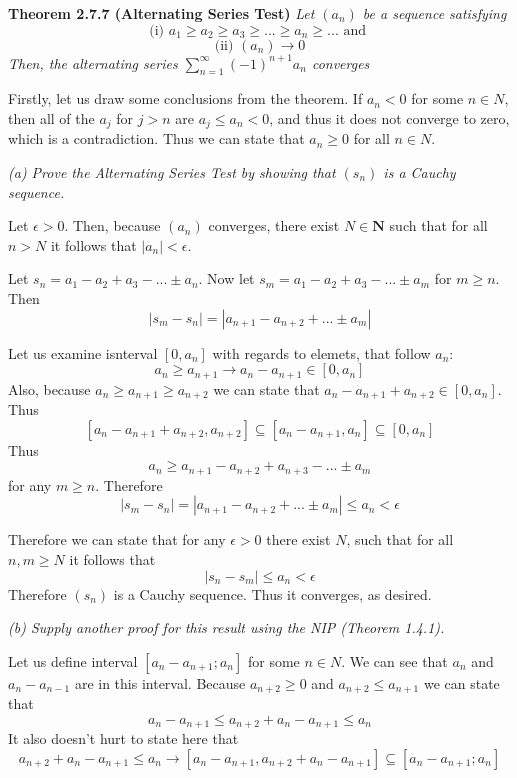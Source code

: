 \documentclass[11pt,oneside,titlepage]{article}
\begin{document}
\textbf{Theorem 2.7.7 (Alternating Series Test)}
\textit{Let $(a_n)$ be a sequence satisfying}
$$\text{(i) } a_1 \geq a_2 \geq a_3 \geq ... \geq a_n \geq ... \text{ and }$$
$$\text{(ii) } (a_n) \to 0$$
\textit{Then, the alternating series $\sum_{n = 1}^{\infty}(-1)^{n + 1} a_n$
converges}

Firstly, let us draw some conclusions from the theorem. If $a_n < 0$ for
some $n \in N$, then all of the $a_j$ for $j > n$ are $a_j \leq a_n < 0$, and
thus it does not converge to zero, which is a contradiction. Thus we
can state that $a_n \geq 0$ for all $n \in N$.

\textit{(a) Prove the Alternating Series Test by showing that $(s_n)$ is a
  Cauchy sequence.}


Let $\epsilon > 0$. Then, because $(a_n)$ converges, there exist
$N \in \textbf{N}$ such that for all $n > N$ it follows that
$|a_n| < \epsilon$.

Let $s_n = a_1 - a_2 + a_3 - ... \pm a_n$. Now let
$s_m = a_1 - a_2 + a_3 - ... \pm a_m$ for $m \geq n$. Then
$$|s_m - s_n| = |a_{n + 1} - a_{n + 2} + ... \pm a_m|$$

Let us examine isnterval $[0, a_n]$ with regards to elemets, that follow $a_n$:
$$a_n \geq a_{n + 1} \to a_n - a_{n + 1} \in [0, a_n]$$
Also, because $a_n \geq a_{n + 1} \geq a_{n + 2}$ we can state that
$a_n - a_{n + 1} + a_{n + 2} \in [0, a_n]$.  Thus
$$[a_n - a_{n + 1} + a_{n + 2}, a_{n + 2}] \subseteq
[a_n - a_{n + 1}, a_n] \subseteq [0, a_n]$$
Thus
$$ a_n \geq a_{n + 1} - a_{n + 2} + a_{n + 3} - ... \pm a_m$$
for any $m \geq n$.
Therefore
$$|s_m - s_n| = |a_{n + 1} - a_{n + 2} + ... \pm a_m| \leq a_n < \epsilon$$


Therefore we can state that for any $\epsilon > 0$ there exist $N$, such that for all
$n, m \geq N$ it follows that
$$|s_n - s_m| \leq a_n < \epsilon$$
Therefore $(s_n)$ is a Cauchy sequence. Thus it converges, as desired.

\textit{(b) Supply another proof for this result using the NIP (Theorem 1.4.1).
}

Let us define  interval $[a_n - a_{n + 1}; a_n]$ for some $n \in N$.
We can see that
$a_n$ and $a_n - a_{n - 1}$ are in this interval. Because
$a_{n + 2} \geq 0$ and  $a_{n + 2} \leq a_{n + 1}$ we can state that
$$a_n - a_{n + 1} \leq a_{n + 2} + a_n - a_{n + 1} \leq a_n$$
It also doesn't hurt to state here that
$$a_{n + 2} + a_n - a_{n + 1} \leq a_n \to [a_n - a_{n + 1}, a_{n + 2} + a_n - a_{n + 1}] \subseteq [a_n - a_{n + 1}; a_n]$$
\end{document}
